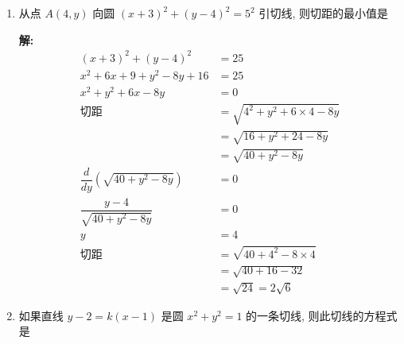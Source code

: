 \documentclass[10pt]{article}
\newcommand{\sol}{\textbf{解:} }
\begin{document}
\begin{enumerate}[leftmargin=*]
  \item 从点 $A(4, y)$ 向圆 $(x+3)^{2}+(y-4)^{2}=5^{2}$ 引切线, 则切距的最小值是

        \sol{}
        \begin{align*}
          (x+3)^{2}+(y-4)^{2}                 & = 25                                   \\
          x^{2} + 6x + 9 + y^{2} - 8y + 16    & = 25                                   \\
          x^{2} + y^{2} + 6x - 8y             & = 0                                    \\
          \text{切距}                           & = \sqrt{4^{2} + y^2 + 6 \times 4 - 8y} \\
                                              & = \sqrt{16 + y^2 + 24 - 8y}            \\
                                              & = \sqrt{40 + y^2 - 8y}                 \\
          \dfrac{d}{dy}(\sqrt{40 + y^2 - 8y}) & = 0                                    \\
          \dfrac{y - 4}{\sqrt{40 + y^2 - 8y}} & = 0                                    \\
          y                                   & = 4                                    \\
          \text{切距}                           & = \sqrt{40 + 4^2 - 8 \times 4}         \\
                                              & = \sqrt{40 + 16 - 32}                  \\
                                              & = \sqrt{24} = 2\sqrt{6}
        \end{align*}

  \item 如果直线 $y-2=k(x-1)$ 是圆 $x^{2}+y^{2}=1$ 的一条切线, 则此切线的方程式是


\end{enumerate}
\end{document}
